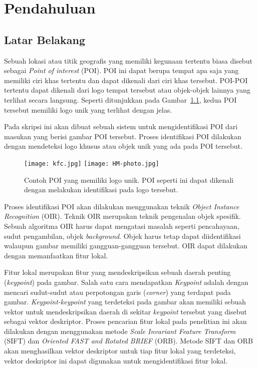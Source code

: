 \chapter{Pendahuluan}
\label{chap:intro}
   
\section{Latar Belakang}
\label{sec:latar_belakang}

Sebuah lokasi atau titik geografis yang memiliki kegunaan tertentu biasa disebut sebagai \textit{Point of interest} (POI). POI ini dapat berupa tempat apa saja yang memiliki ciri khas tertentu dan dapat dikenali dari ciri khas tersebut. POI-POI tertentu dapat dikenali dari logo tempat tersebut atau objek-objek lainnya yang terlihat secara langsung. Seperti ditunjukkan pada Gambar~\ref{fig:poi_with_logo}, kedua POI tersebut memiliki logo unik yang terlihat dengan jelas.

Pada skripsi ini akan dibuat sebuah sistem untuk mengidentifikasi POI dari masukan yang berisi gambar POI tersebut. Proses identifikasi POI dilakukan dengan mendeteksi logo khusus atau objek unik yang ada pada POI tersebut.
\begin{figure}[H]
	\centering
	\texttt{[image: kfc.jpg]}
	\texttt{[image: HM-photo.jpg]}
	\caption{Contoh POI yang memiliki logo unik. POI seperti ini dapat dikenali dengan melakukan identifikasi pada logo tersebut.}
	\label{fig:poi_with_logo}
\end{figure}

Proses identifikasi POI akan dilakukan menggunakan teknik \textit{Object Instance Recognition} (OIR). Teknik OIR merupakan teknik pengenalan objek spesifik. Sebuah algoritma OIR harus dapat mengatasi masalah seperti pencahayaan, sudut pengambilan, objek \textit{background}. Objek harus tetap dapat diidentifikasi walaupun gambar memiliki gangguan-gangguan tersebut. OIR dapat dilakukan dengan memanfaatkan fitur lokal.

Fitur lokal merupakan fitur yang mendeskripsikan sebuah daerah penting (\textit{keypoint}) pada gambar. Salah satu cara mendapatkan \textit{Keypoint} adalah dengan mencari sudut-sudut atau perpotongan garis (\textit{corner}) yang terdapat pada gambar. \textit{Keypoint-keypoint} yang terdeteksi pada gambar akan memiliki sebuah vektor untuk mendeskripsikan daerah di sekitar \textit{keypoint} tersebut yang disebut sebagai vektor deskriptor. Proses pencarian fitur lokal pada penelitian ini akan dilakukan dengan menggunakan metode \textit{Scale Invariant Feature Transform} (SIFT) dan \textit{Oriented FAST and Rotated BRIEF} (ORB). Metode SIFT dan ORB akan menghasilkan vektor deskriptor untuk tiap fitur lokal yang terdeteksi, vektor deskriptor ini dapat digunakan untuk mengidentifikasi fitur lokal.

